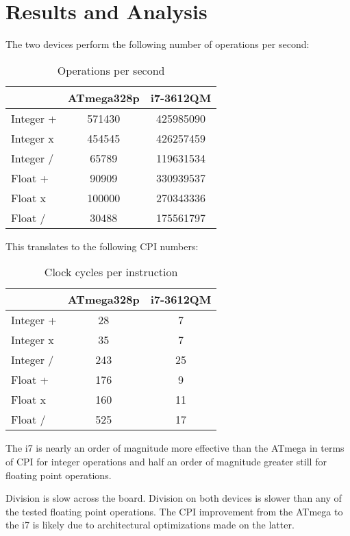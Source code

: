\documentclass[12pt,letterpaper]{article}
\begin{document}
\section*{Results and Analysis}

The two devices perform the following number of operations per second:

\begin{table}[!h]
	\centering
	\caption{Operations per second}
	\begin{tabular}{|l|c|c|} \hline
		          & ATmega328p & i7-3612QM \\ \hline\hline
		Integer + & 571430 & 425985090 \\ \hline
		Integer x & 454545 & 426257459 \\ \hline
		Integer / & 65789  & 119631534 \\ \hline
		Float +   & 90909  & 330939537 \\ \hline
		Float x   & 100000 & 270343336 \\ \hline
		Float /   & 30488  & 175561797 \\ \hline
	\end{tabular}
\end{table}

This translates to the following CPI numbers:

\begin{table}[!h]
	\centering
	\caption{Clock cycles per instruction}
	\begin{tabular}{|l|c|c|} \hline
		          & ATmega328p & i7-3612QM \\ \hline\hline
		Integer + & 28  & 7  \\ \hline
		Integer x & 35  & 7  \\ \hline
		Integer / & 243 & 25 \\ \hline
		Float +   & 176 & 9  \\ \hline
		Float x   & 160 & 11 \\ \hline
		Float /   & 525 & 17 \\ \hline
	\end{tabular}
\end{table}

The i7 is nearly an order of magnitude more effective than the ATmega in terms
of CPI for integer operations and half an order of magnitude greater still for
floating point operations.

Division is slow across the board. Division on both devices is slower than any
of the tested floating point operations. The CPI improvement from the ATmega to
the i7 is likely due to architectural optimizations made on the latter.




\end{document}
